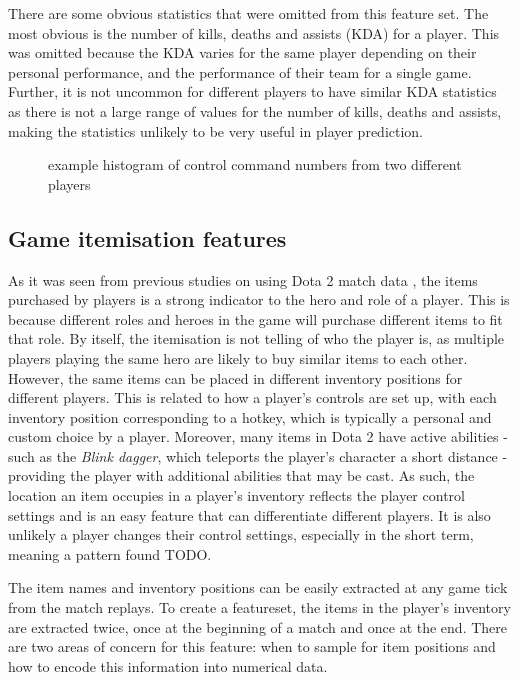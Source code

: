 \documentclass[Report.tex]{subfiles}
\begin{document}
There are some obvious statistics that were omitted from this feature set. The most obvious is the number of kills, deaths and assists (KDA) for a player. This was omitted because the KDA varies for the same player depending on their personal performance, and the performance of their team for a single game. Further, it is not uncommon for different players to have similar KDA statistics as there is not a large range of values for the number of kills, deaths and assists, making the statistics unlikely to be very useful in player prediction.

\begin{figure}[H]
\caption{example histogram of control command numbers from two different players}
\end{figure}

\subsection{Game itemisation features}
As it was seen from previous studies on using Dota 2 match data \cite{dota-gao, dota-eggert}, the items purchased by players is a strong indicator to the hero and role of a player. This is because different roles and heroes in the game will purchase different items to fit that role. By itself, the itemisation is not telling of who the player is, as multiple players playing the same hero are likely to buy similar items to each other. However, the same items can be placed in different inventory positions for different players. This is related to how a player's controls are set up, with each inventory position corresponding to a hotkey, which is typically a personal and custom choice by a player. Moreover, many items in Dota 2 have active abilities - such as the \textit{Blink dagger}, which teleports the player's character a short distance - providing the player with additional abilities that may be cast. As such, the location an item occupies in a player's inventory reflects the player control settings and is an easy feature that can differentiate different players. It is also unlikely a player changes their control settings, especially in the short term, meaning a pattern found TODO. 


The item names and inventory positions can be easily extracted at any game tick from the match replays. To create a featureset, the items in the player's inventory are extracted twice, once at the beginning of a match and once at the end. There are two areas of concern for this feature: when to sample for item positions and how to encode this information into numerical data. 
\end{document}
